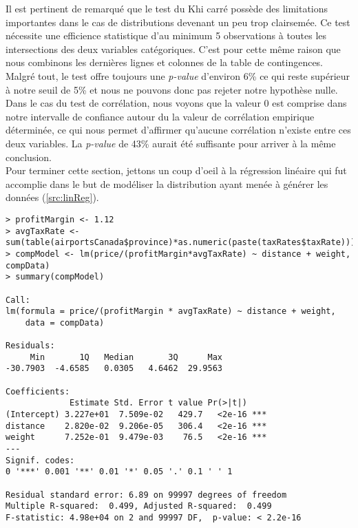\vspace{\baselineskip}
\noindent
Il est pertinent de remarqué que le test du Khi carré possède des limitations importantes dans le cas de distributions devenant un peu trop clairsemée. Ce test nécessite une efficience statistique d'au minimum 5 observations à toutes les intersections des deux variables catégoriques. C'est pour cette même raison que nous combinons les dernières lignes et colonnes de la table de contingences. Malgré tout, le test offre toujours une \emph{p-value} d'environ 6\% ce qui reste supérieur à notre seuil de 5\% et nous ne pouvons donc pas rejeter notre hypothèse nulle. Dans le cas du test de corrélation, nous voyons que la valeur 0 est comprise dans notre intervalle de confiance autour du la valeur de corrélation empirique déterminée, ce qui nous permet d'affirmer qu'aucune corrélation n'existe entre ces deux variables. La \emph{p-value} de 43\% aurait été suffisante pour arriver à la même conclusion. \\

\noindent
Pour terminer cette section, jettons un coup d'oeil à la régression linéaire qui fut accomplie dans le but de modéliser la distribution ayant menée à générer les données (\autoref{src:linReg}).

\begin{lstlisting}[caption = Régression linéaire sur données empiriques,label=src:linReg]
> profitMargin <- 1.12
> avgTaxRate <- sum(table(airportsCanada$province)*as.numeric(paste(taxRates$taxRate)))/length(airportsCanada$province)
> compModel <- lm(price/(profitMargin*avgTaxRate) ~ distance + weight, compData)
> summary(compModel)

Call:
lm(formula = price/(profitMargin * avgTaxRate) ~ distance + weight, 
    data = compData)

Residuals:
     Min       1Q   Median       3Q      Max 
-30.7903  -4.6585   0.0305   4.6462  29.9563 

Coefficients:
             Estimate Std. Error t value Pr(>|t|)    
(Intercept) 3.227e+01  7.509e-02   429.7   <2e-16 ***
distance    2.820e-02  9.206e-05   306.4   <2e-16 ***
weight      7.252e-01  9.479e-03    76.5   <2e-16 ***
---
Signif. codes:  
0 '***' 0.001 '**' 0.01 '*' 0.05 '.' 0.1 ' ' 1

Residual standard error: 6.89 on 99997 degrees of freedom
Multiple R-squared:  0.499,	Adjusted R-squared:  0.499 
F-statistic: 4.98e+04 on 2 and 99997 DF,  p-value: < 2.2e-16
\end{lstlisting}

